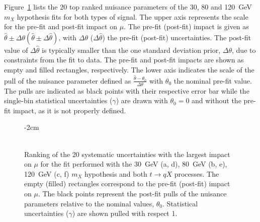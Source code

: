 Figure~\ref{tqX:ranking3080120} lists the 20 top ranked nuisance parameters of the 30, 80 and 120~GeV $m_X$ hypothesis fits for both types of signal. The upper axis represents the scale for the pre-fit and post-fit impact on $\mu$. The pre-fit (post-fit) impact is given as $\hat{\theta} \pm \Delta\theta (\hat{\theta} \pm \Delta\hat{\theta})$, with $\Delta\theta$ ($\Delta\hat{\theta}$) the pre-fit (post-fit) uncertainties. The post-fit value of $\Delta\hat{\theta}$ is typically smaller than the one standard deviation prior, $\Delta\theta$, due to constraints from the fit to data. The pre-fit and post-fit impacts are shown as empty and filled rectangles, respectively. The lower axis indicates the scale of the pull of the nuisance parameter defined as $\frac{\hat{\theta} -\theta_0}{\Delta\theta}$ with $\theta_0$ the nominal pre-fit value. The pulls are indicated as black points with their respective error bar while the single-bin statistical uncertainties ($\gamma$) are drawn with $\theta_0=0$ and without the pre-fit impact, as it is not properly defined.\\

\begin{figure}[htb]
    \RawFloats
    \addtolength{\leftskip} {-2cm} %
    \addtolength{\rightskip}{-2cm}
    \centering
    \\
    \\
    \caption{Ranking of the 20 systematic uncertainties with the largest impact on $\mu$ for the fit performed with the 30~GeV (a, d), 80~GeV (b, e), 120~GeV (c, f) $m_X$ hypothesis and both $t\to qX$ processes. The empty (filled) rectangles correspond  to the pre-fit (post-fit) impact on $\mu$. The black points represent the post-fit pulls of the nuisance parameters relative to the nominal values, $\theta_0$. Statistical uncertainties ($\gamma$) are shown pulled with respect 1.
    }
    \label{tqX:ranking3080120}
\end{figure}

